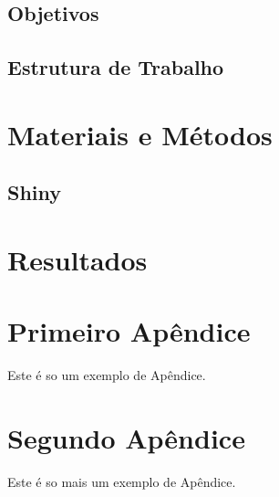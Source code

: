 \documentclass[
  fleqn,ebook]{ic}
\begin{document}
\hypertarget{objetivos}{%
\subsection{Objetivos}\label{objetivos}}

\hypertarget{estrutura-de-trabalho}{%
\subsection{Estrutura de Trabalho}\label{estrutura-de-trabalho}}

\hypertarget{MateriaisMetodos}{%
\section{Materiais e Métodos}\label{MateriaisMetodos}}

\hypertarget{shiny}{%
\subsection{Shiny}\label{shiny}}

\hypertarget{Resultados}{%
\section{Resultados}\label{Resultados}}

\nocite{*}

  

\hypertarget{appendix-appendix}{%
\appendix}


\hypertarget{primeiro-apuxeandice}{%
\section{Primeiro Apêndice}\label{primeiro-apuxeandice}}

Este é so um exemplo de Apêndice.

\hypertarget{segundo-apuxeandice}{%
\section{Segundo Apêndice}\label{segundo-apuxeandice}}

Este é so mais um exemplo de Apêndice.
\end{document}
